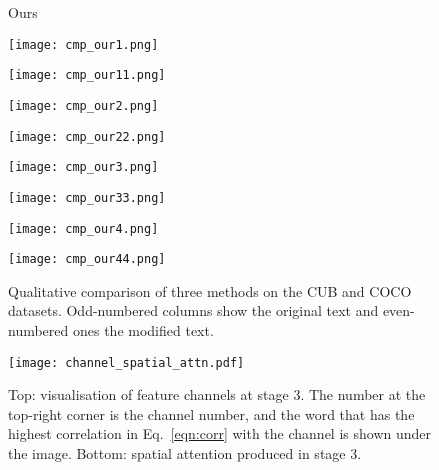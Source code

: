 \documentclass{article}
\begin{document}
\begin{figure}[t]
\begin{minipage}{0.12\textwidth}\raggedright
\scriptsize{Ours}\\
\end{minipage}
\quad\begin{minipage}{0.10\textwidth}
\texttt{[image: cmp\_our1.png]}
\end{minipage}
\noindent\begin{minipage}{0.10\textwidth}
\texttt{[image: cmp\_our11.png]}
\end{minipage}
\noindent\begin{minipage}{0.10\textwidth}
\texttt{[image: cmp\_our2.png]}
\end{minipage}
\noindent\begin{minipage}{0.10\textwidth}
\texttt{[image: cmp\_our22.png]}
\end{minipage}
\noindent\begin{minipage}{0.10\textwidth}
\texttt{[image: cmp\_our3.png]}
\end{minipage}
\noindent\begin{minipage}{0.10\textwidth}
\texttt{[image: cmp\_our33.png]}
\end{minipage}
\noindent\begin{minipage}{0.10\textwidth}
\texttt{[image: cmp\_our4.png]}
\end{minipage}
\noindent\begin{minipage}{0.10\textwidth}
\texttt{[image: cmp\_our44.png]}
\end{minipage}
\hfill \centering
\caption{Qualitative comparison of three methods on the CUB and COCO datasets. Odd-numbered columns show the original text and even-numbered ones the modified text.}
\label{fig:qual_cmp}
\end{figure}

\begin{figure}[ht]
\begin{minipage}{0.90\textwidth}
\texttt{[image: channel\_spatial\_attn.pdf]}
\end{minipage}
\centering
\caption{Top: visualisation of feature channels at stage 3. The number at the top-right corner is the channel number, and the word that has the highest correlation  in Eq.~\ref{eqn:corr} with the channel is shown under the image. Bottom: spatial attention produced in stage 3.}
\label{fig:channel}
\end{figure}
\end{document}
